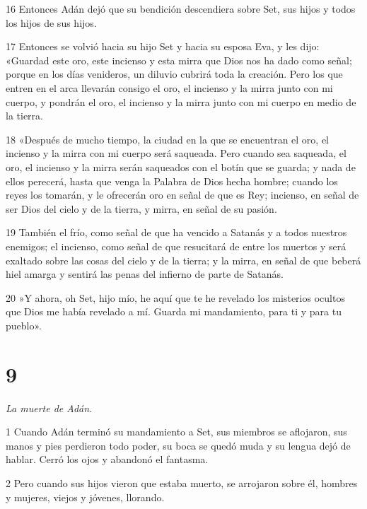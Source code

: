 \par 16 Entonces Adán dejó que su bendición descendiera sobre Set, sus hijos y todos los hijos de sus hijos.

\par 17 Entonces se volvió hacia su hijo Set y hacia su esposa Eva, y les dijo: «Guardad este oro, este incienso y esta mirra que Dios nos ha dado como señal; porque en los días venideros, un diluvio cubrirá toda la creación. Pero los que entren en el arca llevarán consigo el oro, el incienso y la mirra junto con mi cuerpo, y pondrán el oro, el incienso y la mirra junto con mi cuerpo en medio de la tierra.

\par 18 «Después de mucho tiempo, la ciudad en la que se encuentran el oro, el incienso y la mirra con mi cuerpo será saqueada. Pero cuando sea saqueada, el oro, el incienso y la mirra serán saqueados con el botín que se guarda; y nada de ellos perecerá, hasta que venga la Palabra de Dios hecha hombre; cuando los reyes los tomarán, y le ofrecerán oro en señal de que es Rey; incienso, en señal de ser Dios del cielo y de la tierra, y mirra, en señal de su pasión.

\par 19 También el frío, como señal de que ha vencido a Satanás y a todos nuestros enemigos; el incienso, como señal de que resucitará de entre los muertos y será exaltado sobre las cosas del cielo y de la tierra; y la mirra, en señal de que beberá hiel amarga y sentirá las penas del infierno de parte de Satanás.

\par 20 »Y ahora, oh Set, hijo mío, he aquí que te he revelado los misterios ocultos que Dios me había revelado a mí. Guarda mi mandamiento, para ti y para tu pueblo».

\chapter{9}

\par \textit{La muerte de Adán.}

\par 1 Cuando Adán terminó su mandamiento a Set, sus miembros se aflojaron, sus manos y pies perdieron todo poder, su boca se quedó muda y su lengua dejó de hablar. Cerró los ojos y abandonó el fantasma.

\par 2 Pero cuando sus hijos vieron que estaba muerto, se arrojaron sobre él, hombres y mujeres, viejos y jóvenes, llorando.

